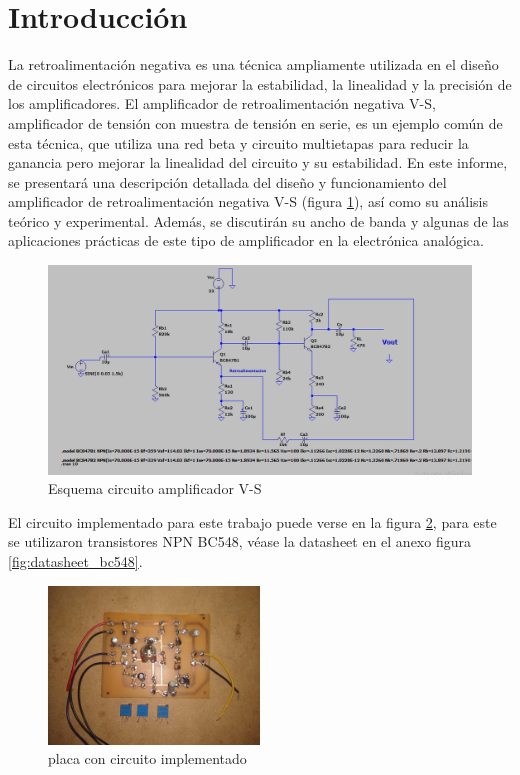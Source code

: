 \documentclass[12pt, letterpaper]{article}
\begin{document}
\newpage
\tableofcontents
\newpage

\section{Introducción}

La retroalimentación negativa es una técnica ampliamente utilizada en el diseño de circuitos electrónicos para mejorar la estabilidad, la linealidad y la precisión de los amplificadores.
El amplificador de retroalimentación negativa V-S, amplificador de tensión con muestra de tensión en serie, es un ejemplo común de esta técnica, que utiliza una red beta y circuito multietapas para reducir la ganancia pero mejorar la linealidad del circuito y su estabilidad.
En este informe, se presentará una descripción detallada del diseño y funcionamiento del amplificador de retroalimentación negativa V-S (figura \ref{fig:circuito}), así como su análisis teórico y experimental.
Además, se discutirán su ancho de banda y algunas de las aplicaciones prácticas de este tipo de amplificador en la electrónica analógica.


\begin{figure}[H]
    \centering
    \includegraphics[width=1\textwidth]{Imagenes/Circuito.png}
    \caption{Esquema circuito amplificador V-S}
    \label{fig:circuito}
\end{figure}
\singlespacing
El circuito implementado para este trabajo puede verse en la figura \ref{fig:circuito_placa}, para este se utilizaron transistores NPN BC548, véase la datasheet en el anexo figura \ref{fig:datasheet_bc548}.

\begin{figure}[H]
    \centering
    \includegraphics[width=0.5\textwidth]{Imagenes/Placa.jpg}
    \caption{placa con circuito implementado}
    \label{fig:circuito_placa}
\end{figure}
\end{document}
